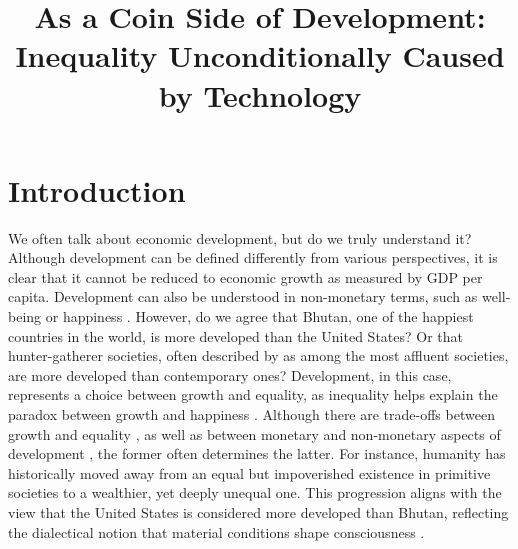 \documentclass[12pt]{article}
\title{As a Coin Side of Development:\\ Inequality Unconditionally Caused by Technology}
\author{}
\date{} %
\begin{document}
\maketitle

\section{Introduction}

We often talk about economic development, but do we truly understand it? Although development can be defined differently from various perspectives, it is clear that it cannot be reduced to economic growth as measured by GDP per capita. Development can also be understood in non-monetary terms, such as well-being or happiness \parencite{agrawal2024economic}. However, do we agree that Bhutan, one of the happiest countries in the world, is more developed than the United States? Or that hunter-gatherer societies, often described by \textcite{sahlins2013original} as among the most affluent societies, are more developed than contemporary ones? Development, in this case, represents a choice between growth and equality, as inequality helps explain the paradox between growth and happiness \parencite{oishi2015income}. Although there are trade-offs between growth and equality \parencite{okun2010equality}, as well as between monetary and non-monetary aspects of development \parencite{kahneman2010high}, the former often determines the latter. For instance, humanity has historically moved away from an equal but impoverished existence in primitive societies to a wealthier, yet deeply unequal one. This progression aligns with the view that the United States is considered more developed than Bhutan, reflecting the dialectical notion that material conditions shape consciousness \parencite{lefebvre2009dialectical}.
\end{document}
